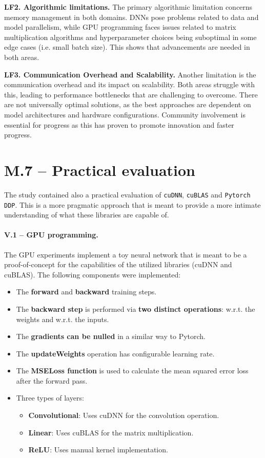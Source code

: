 \textbf{LF2. Algorithmic limitations.}
The primary algorithmic limitation concerns memory management in both domains.
DNNs pose problems related to data and model parallelism, while GPU programming faces issues
related to matrix multiplication algorithms and hyperparameter choices being suboptimal in some edge cases
(i.e. small batch size). This shows that advancements are needed in both areas.

\textbf{LF3. Communication Overhead and Scalability.}
Another limitation is the communication overhead and its impact on scalability. Both areas struggle
with this, leading to performance bottlenecks that are challenging to overcome. There are not universally
optimal solutions, as the best approaches are dependent on model architectures and hardware configurations.
Community involvement is essential for progress as this has proven to promote innovation and faster progress.

\section{M.7 -- Practical evaluation}
\label{sec:practical-evaluation}
The study contained also a practical evaluation of \texttt{cuDNN}, \texttt{cuBLAS} and \texttt{Pytorch DDP}.
This is a more pragmatic approach that is meant to provide a more intimate understanding of what
these libraries are capable of.

\paragraph{V.1 -- GPU programming.}
The GPU experiments implement a toy neural network that is meant to be a proof-of-concept for the
capabilities of the utilized libraries (cuDNN and cuBLAS). The following components were
implemented:

\begin{itemize}
	\item The \textbf{forward} and \textbf{backward} training steps.
	\item The \textbf{backward step} is performed via \textbf{two distinct operations}: w.r.t. the weights
	      and w.r.t. the inputs.
	\item The \textbf{gradients can be nulled} in a similar way to Pytorch.
	\item The \textbf{updateWeights} operation has configurable learning rate.
	\item The \textbf{MSELoss function} is used to calculate the mean squared error loss after the forward
	      pass.
	\item Three types of layers:
	      \begin{itemize}
		      \item \textbf{Convolutional}: Uses cuDNN for the convolution operation.
		      \item \textbf{Linear}: Uses cuBLAS for the matrix multiplication.
		      \item \textbf{ReLU}: Uses manual kernel implementation.
	      \end{itemize}
\end{itemize}

